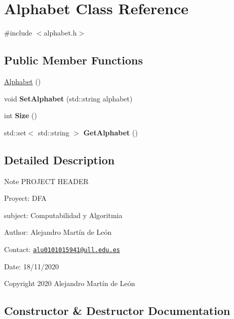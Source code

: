 \hypertarget{classAlphabet}{}\section{Alphabet Class Reference}
\label{classAlphabet}


{\ttfamily \#include $<$alphabet.\+h$>$}

\subsection*{Public Member Functions}
\begin{DoxyCompactItemize}
\item 
\hyperlink{classAlphabet_aac9f2f615174ca6c8f89331239cb765e}{Alphabet} ()
\item 
\mbox{\label{classAlphabet_a2a61d36e511d77704215dce942847ed9}} 
void {\bfseries Set\+Alphabet} (std\+::string alphabet)
\item 
\mbox{\label{classAlphabet_a154f45f063a75a8116e8f9022440287e}} 
int {\bfseries Size} ()
\item 
\mbox{\label{classAlphabet_aa27c86b98daa058dc4f299b13c76ee8b}} 
std\+::set$<$ std\+::string $>$ {\bfseries Get\+Alphabet} ()
\end{DoxyCompactItemize}


\subsection{Detailed Description}
\begin{DoxyNote}{Note}
P\+R\+O\+J\+E\+CT H\+E\+A\+D\+ER 

Proyect\+: D\+FA 

subject\+: Computabilidad y Algoritmia 

Author\+: Alejandro Martín de León 

Contact\+: \href{mailto:alu0101015941@ull.edu.es}{\tt alu0101015941@ull.\+edu.\+es} 

Date\+: 18/11/2020 

Copyright 2020 Alejandro Martín de León 
\end{DoxyNote}


\subsection{Constructor \& Destructor Documentation}
\mbox{\label{classAlphabet_aac9f2f615174ca6c8f89331239cb765e}} 
